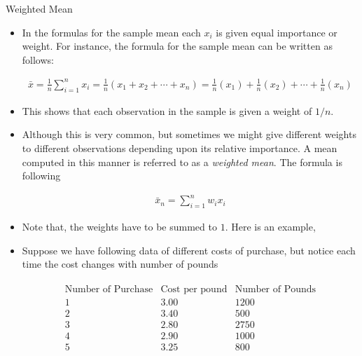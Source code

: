 \documentclass[8pt, usepdftitle=false]{beamer}
\begin{document}
\begin{frame}[allowframebreaks]{Weighted Mean}

\begin{itemize}

\item In the formulas for the sample mean each $x_i$ is given equal importance or weight. For instance, the formula for the sample mean can be written as follows:

\begin{align*}
  \bar{x}=\frac{1}{n}\sum_{i = 1}^{n} x_i=\frac{1}{n}\left(x_1+x_2+\cdots+x_n\right)=\frac{1}{n}\left(x_1\right)+\frac{1}{n}\left(x_2\right)+\cdots+\frac{1}{n}\left(x_n\right)
\end{align*}



\item This shows that each observation in the sample is given a weight of $1 / n$. 

\item Although this is very common, but sometimes we might give different weights to different observations  depending upon its relative importance. A mean computed in this manner is referred to as a \emph{weighted mean}. The formula is following


\begin{align}\label{eq:weighted_mean1}
  \bar{x}_n=\sum_{i = 1}^{n} w_i x_i
\end{align}

\item Note that, the weights have to be summed to $1$. Here is an example, 

\framebreak
  
\item Suppose we have following data of different costs of purchase, but notice each time the cost changes with number of pounds


\begin{align*}
\begin{array}{r|r|r}
\text{Number of Purchase} & \text{Cost per pound} & \text{Number of Pounds} \\ \hline
1 & 3.00 & 1200 \\
2 & 3.40 & 500 \\
3 & 2.80 & 2750 \\
4 & 2.90 & 1000 \\
5 & 3.25 & 800
\end{array}
\end{align*}


\end{itemize}
\end{frame}
\end{document}
